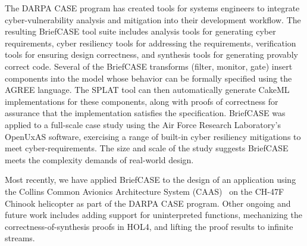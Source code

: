 The DARPA CASE program has created tools for systems engineers to
integrate cyber-vulnerability analysis and mitigation into their
development workflow. The resulting BriefCASE tool suite includes
analysis tools for generating cyber requirements, cyber resiliency
tools for addressing the requirements, verification tools for ensuring
design correctness, and synthesis tools for generating provably
correct code. Several of the BriefCASE transforms (filter, monitor,
gate) insert components into the model whose behavior can be formally
specified using the AGREE language.  The SPLAT tool can then
automatically generate CakeML implementations for these components,
along with proofs of correctness for assurance that the implementation
satisfies the specification.
%
BriefCASE was applied to a full-scale case study using the Air Force
Research Laboratory's OpenUxAS software, exercising a range of
built-in cyber resiliency mitigations to meet cyber-requirements.  The
size and scale of the study suggests BriefCASE meets the complexity
demands of real-world design.

Most recently, we have applied BriefCASE to the design of
an application using the Collins Common Avionics Architecture System
(CAAS)~\cite{caas} on the CH-47F Chinook helicopter as part of the
DARPA CASE program.  Other ongoing and future work includes
adding support for uninterpreted functions, mechanizing the
correctness-of-synthesis proofs in HOL4, and lifting the proof results
to infinite streams.
